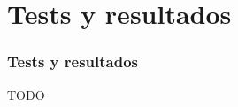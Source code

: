 \section{Tests y resultados}
\begin{frame}[shrink]
  \frametitle{Tests y resultados}
  TODO
\end{frame}

